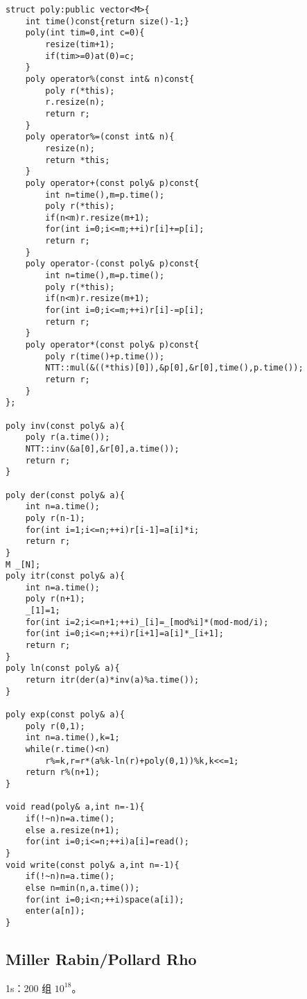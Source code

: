 \documentclass[12pt]{ctexart}
\begin{document}
\begin{lstlisting}
struct poly:public vector<M>{
	int time()const{return size()-1;}
	poly(int tim=0,int c=0){
		resize(tim+1);
		if(tim>=0)at(0)=c;
	}
	poly operator%(const int& n)const{
		poly r(*this);
		r.resize(n);
		return r;
	}
	poly operator%=(const int& n){
		resize(n);
		return *this;
	}
	poly operator+(const poly& p)const{
		int n=time(),m=p.time();
		poly r(*this);
		if(n<m)r.resize(m+1);
		for(int i=0;i<=m;++i)r[i]+=p[i];
		return r;
	}
	poly operator-(const poly& p)const{
		int n=time(),m=p.time();
		poly r(*this);
		if(n<m)r.resize(m+1);
		for(int i=0;i<=m;++i)r[i]-=p[i];
		return r;
	}
	poly operator*(const poly& p)const{
		poly r(time()+p.time());
		NTT::mul(&((*this)[0]),&p[0],&r[0],time(),p.time());
		return r;
	}
};

poly inv(const poly& a){
	poly r(a.time());
	NTT::inv(&a[0],&r[0],a.time());
	return r;
}

poly der(const poly& a){
	int n=a.time();
	poly r(n-1);
	for(int i=1;i<=n;++i)r[i-1]=a[i]*i;
	return r;
}
M _[N];
poly itr(const poly& a){
	int n=a.time();
	poly r(n+1);
	_[1]=1;
	for(int i=2;i<=n+1;++i)_[i]=_[mod%i]*(mod-mod/i);
	for(int i=0;i<=n;++i)r[i+1]=a[i]*_[i+1];
	return r;
}
poly ln(const poly& a){
	return itr(der(a)*inv(a)%a.time());
}

poly exp(const poly& a){
	poly r(0,1);
	int n=a.time(),k=1;
	while(r.time()<n)
		r%=k,r=r*(a%k-ln(r)+poly(0,1))%k,k<<=1;
	return r%(n+1);
}

void read(poly& a,int n=-1){
	if(!~n)n=a.time();
	else a.resize(n+1);
	for(int i=0;i<=n;++i)a[i]=read();
}
void write(const poly& a,int n=-1){
	if(!~n)n=a.time();
	else n=min(n,a.time());
	for(int i=0;i<n;++i)space(a[i]);
	enter(a[n]);
}
\end{lstlisting}

\subsection{Miller Rabin/Pollard Rho}

1s：$200$ 组 $10^{18}$。
\end{document}
